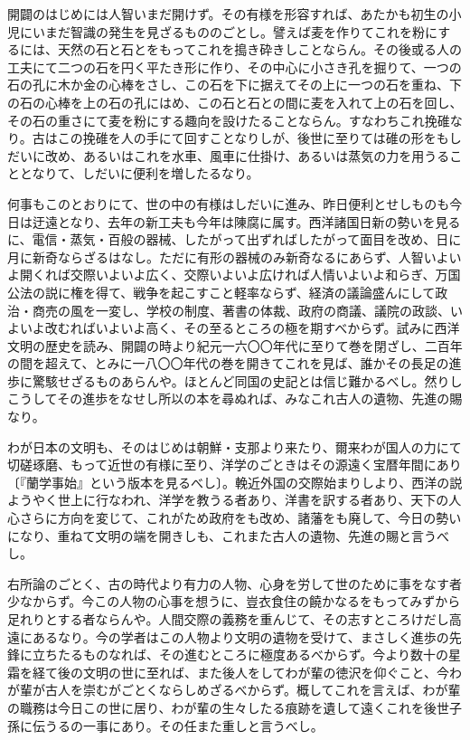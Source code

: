 \documentclass[a4paper, platex, dvipdfmx]{jsarticle}
\begin{document}
開闢のはじめには人智いまだ開けず。その有様を形容すれば、あたかも初生の小児にいまだ智識の発生を見ざるもののごとし。譬えば麦を作りてこれを粉にするには、天然の石と石とをもってこれを搗き砕きしことならん。その後或る人の工夫にて二つの石を円く平たき形に作り、その中心に小さき孔を掘りて、一つの石の孔に木か金の心棒をさし、この石を下に据えてその上に一つの石を重ね、下の石の心棒を上の石の孔にはめ、この石と石との間に麦を入れて上の石を回し、その石の重さにて麦を粉にする趣向を設けたることならん。すなわちこれ挽碓なり。古はこの挽碓を人の手にて回すことなりしが、後世に至りては碓の形をもしだいに改め、あるいはこれを水車、風車に仕掛け、あるいは蒸気の力を用うることとなりて、しだいに便利を増したるなり。

何事もこのとおりにて、世の中の有様はしだいに進み、昨日便利とせしものも今日は迂遠となり、去年の新工夫も今年は陳腐に属す。西洋諸国日新の勢いを見るに、電信・蒸気・百般の器械、したがって出ずればしたがって面目を改め、日に月に新奇ならざるはなし。ただに有形の器械のみ新奇なるにあらず、人智いよいよ開くれば交際いよいよ広く、交際いよいよ広ければ人情いよいよ和らぎ、万国公法の説に権を得て、戦争を起こすこと軽率ならず、経済の議論盛んにして政治・商売の風を一変し、学校の制度、著書の体裁、政府の商議、議院の政談、いよいよ改むればいよいよ高く、その至るところの極を期すべからず。試みに西洋文明の歴史を読み、開闢の時より紀元一六〇〇年代に至りて巻を閉ざし、二百年の間を超えて、とみに一八〇〇年代の巻を開きてこれを見ば、誰かその長足の進歩に驚駭せざるものあらんや。ほとんど同国の史記とは信じ難かるべし。然りしこうしてその進歩をなせし所以の本を尋ぬれば、みなこれ古人の遺物、先進の賜なり。

わが日本の文明も、そのはじめは朝鮮・支那より来たり、爾来わが国人の力にて切磋琢磨、もって近世の有様に至り、洋学のごときはその源遠く宝暦年間にあり〔『蘭学事始』という版本を見るべし〕。輓近外国の交際始まりしより、西洋の説ようやく世上に行なわれ、洋学を教うる者あり、洋書を訳する者あり、天下の人心さらに方向を変じて、これがため政府をも改め、諸藩をも廃して、今日の勢いになり、重ねて文明の端を開きしも、これまた古人の遺物、先進の賜と言うべし。

右所論のごとく、古の時代より有力の人物、心身を労して世のために事をなす者少なからず。今この人物の心事を想うに、豈衣食住の饒かなるをもってみずから足れりとする者ならんや。人間交際の義務を重んじて、その志すところけだし高遠にあるなり。今の学者はこの人物より文明の遺物を受けて、まさしく進歩の先鋒に立ちたるものなれば、その進むところに極度あるべからず。今より数十の星霜を経て後の文明の世に至れば、また後人をしてわが輩の徳沢を仰ぐこと、今わが輩が古人を崇むがごとくならしめざるべからず。概してこれを言えば、わが輩の職務は今日この世に居り、わが輩の生々したる痕跡を遺して遠くこれを後世子孫に伝うるの一事にあり。その任また重しと言うべし。
\end{document}

